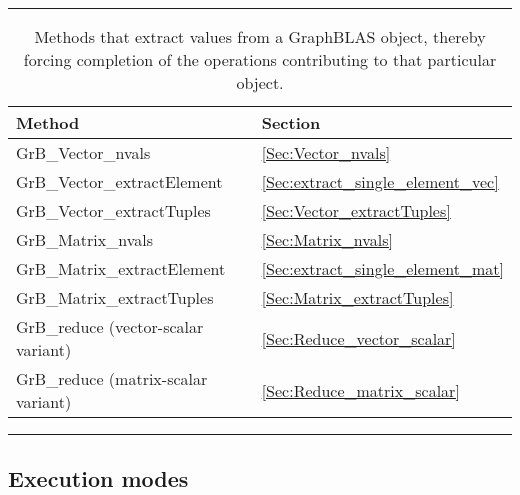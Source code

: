 \begin{table}[htb]
	\hrule
	\begin{center}
		\caption{Methods that extract values from a GraphBLAS object, thereby
		forcing completion of the operations contributing to that particular object.}
		\label{Tab:ExtractMethods}

		\begin{tabular}{l|l}
			Method	& Section \\ \hline

			{\sf GrB\_Vector\_nvals}		& \ref{Sec:Vector_nvals}		\\
			{\sf GrB\_Vector\_extractElement} 	& \ref{Sec:extract_single_element_vec}	\\
			{\sf GrB\_Vector\_extractTuples}	& \ref{Sec:Vector_extractTuples}	\\
			{\sf GrB\_Matrix\_nvals}		& \ref{Sec:Matrix_nvals}		\\
			{\sf GrB\_Matrix\_extractElement} 	& \ref{Sec:extract_single_element_mat}	\\
			{\sf GrB\_Matrix\_extractTuples}	& \ref{Sec:Matrix_extractTuples}	\\
			{\sf GrB\_reduce} (vector-scalar variant)		& \ref{Sec:Reduce_vector_scalar}		\\
			{\sf GrB\_reduce} (matrix-scalar variant)		& \ref{Sec:Reduce_matrix_scalar}		\\
		\end{tabular}
	\end{center}
	\hrule
\end{table}

\subsection{Execution modes}

